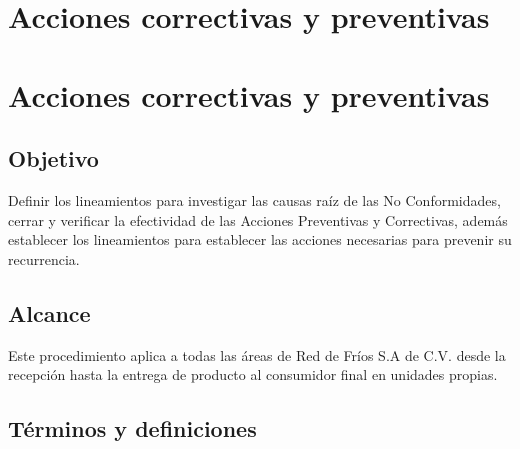 \thispagestyle{formato-PI}
\renewcommand{\MayorVer}{2}
\renewcommand{\MenorVer}{1}
\renewcommand{\Codigo}{PSA-1-PROG} %
\renewcommand{\FechaPub}{2023--01}

\renewcommand{\Titulo}{Acciones correctivas y preventivas}
\section{\Titulo}
\section{Acciones correctivas y preventivas}

\subsection{Objetivo}

Definir los lineamientos para investigar las causas raíz de las No Conformidades, cerrar y verificar la efectividad de las Acciones Preventivas y Correctivas, además establecer los lineamientos para establecer las acciones necesarias para prevenir su recurrencia.

\subsection{Alcance}

Este procedimiento aplica a todas las áreas de Red de Fríos S.A de C.V. desde la recepción hasta la entrega de producto al consumidor final en unidades propias.

\subsection{Términos y definiciones}

